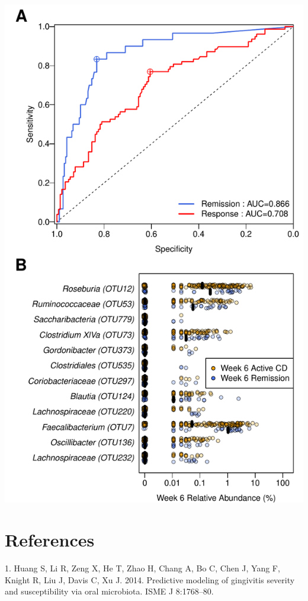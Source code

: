 \documentclass[12pt,]{article}
\begin{document}
\includegraphics{figures/Figure5_wk6Xwk6.pdf}

\newpage

\section*{References}\label{references}

\hypertarget{refs}{}
\hypertarget{ref-Huang_gingivitis_2014}{}
1. Huang S, Li R, Zeng X, He T, Zhao H, Chang A, Bo C, Chen J, Yang F,
Knight R, Liu J, Davis C, Xu J. 2014. Predictive modeling of gingivitis
severity and susceptibility via oral microbiota. ISME J 8:1768--80.
\end{document}
